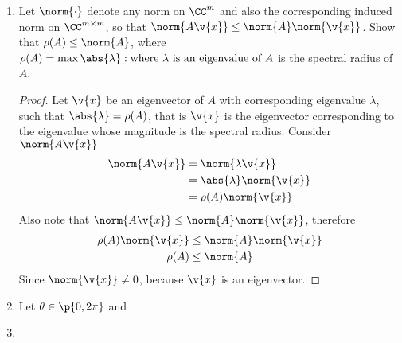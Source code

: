 \documentclass[11pt]{article}
\begin{document}
\begin{enumerate}
    \item %
        Let $\norm{\cdot}$ denote any norm on $\CC^m$ and also the corresponding
        induced norm on $\CC^{m \times m}$, so that
        $\norm{A\v{x}} \le \norm{A}\norm{\v{x}}$.
        Show that $\rho(A) \le \norm{A}$, where
        $\rho(A) = \max{\abs{\lambda}:\text{where $\lambda$ is an eigenvalue of $A$}}$
        is the spectral radius of $A$.

        \begin{proof}
            Let $\v{x}$ be an eigenvector of $A$ with corresponding eigenvalue
            $\lambda$, such that $\abs{\lambda} = \rho(A)$, that is $\v{x}$ is
            the eigenvector corresponding to the eigenvalue whose magnitude is
            the spectral radius.
            Consider $\norm{A\v{x}}$
            \begin{align*}
                \norm{A\v{x}} &= \norm{\lambda \v{x}} \\
                &= \abs{\lambda} \norm{\v{x}} \\
                &= \rho(A) \norm{\v{x}}
            \end{align*}
            Also note that $\norm{A\v{x}} \le \norm{A}\norm{\v{x}}$, therefore
            \begin{align*}
                \rho(A) \norm{\v{x}} &\le \norm{A}\norm{\v{x}} \\
                \rho(A) &\le \norm{A}
            \end{align*}
            Since $\norm{\v{x}} \neq 0$, because $\v{x}$ is an eigenvector.
        \end{proof}

    \item %
        Let $\theta \in \p{0, 2\pi}$ and 
    \item %
\end{enumerate}
\end{document}
